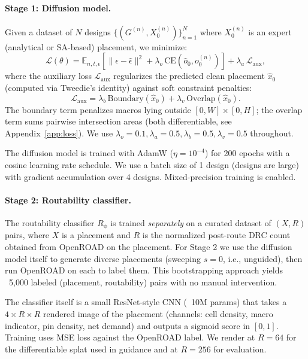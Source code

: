 \paragraph{Stage 1: Diffusion model.}
Given a dataset of $N$ designs $\{(G^{(n)}, X^{(n)}_0)\}_{n=1}^N$ where $X^{(n)}_0$ is an expert (analytical or SA-based) placement, we minimize:
\begin{equation}
\mathcal{L}(\theta) = \mathbb{E}_{n, t, \epsilon}\left[ \|\epsilon - \hat\epsilon\|^2 + \lambda_o\, \textrm{CE}(\hat{o}_0, o^{(n)}_0) \right] + \lambda_a\, \mathcal{L}_\textrm{aux},
\label{eq:total_loss}
\end{equation}
where the auxiliary loss $\mathcal{L}_\textrm{aux}$ regularizes the predicted clean placement $\hat{x}_0$ (computed via Tweedie's identity) against soft constraint penalties:
\begin{equation}
\mathcal{L}_\textrm{aux} = \lambda_b\, \textrm{Boundary}(\hat{x}_0) + \lambda_v\, \textrm{Overlap}(\hat{x}_0).
\end{equation}
The boundary term penalizes macros lying outside $[0, W] \times [0, H]$; the overlap term sums pairwise intersection areas (both differentiable, see Appendix~\ref{app:loss}). We use $\lambda_o = 0.1, \lambda_a = 0.5, \lambda_b = 0.5, \lambda_v = 0.5$ throughout.

The diffusion model is trained with AdamW ($\eta = 10^{-4}$) for 200 epochs with a cosine learning rate schedule. We use a batch size of 1 design (designs are large) with gradient accumulation over 4 designs. Mixed-precision training is enabled.

\paragraph{Stage 2: Routability classifier.}
The routability classifier $R_\phi$ is trained \emph{separately} on a curated dataset of $(X, R)$ pairs, where $X$ is a placement and $R$ is the normalized post-route DRC count obtained from OpenROAD on the placement. For Stage 2 we use the diffusion model itself to generate diverse placements (sweeping $s = 0$, i.e., unguided), then run OpenROAD on each to label them. This bootstrapping approach yields ~5,000 labeled (placement, routability) pairs with no manual intervention.

The classifier itself is a small ResNet-style CNN (~10M params) that takes a $4 \times R \times R$ rendered image of the placement (channels: cell density, macro indicator, pin density, net demand) and outputs a sigmoid score in $[0, 1]$. Training uses MSE loss against the OpenROAD label. We render at $R = 64$ for the differentiable splat used in guidance and at $R = 256$ for evaluation.

